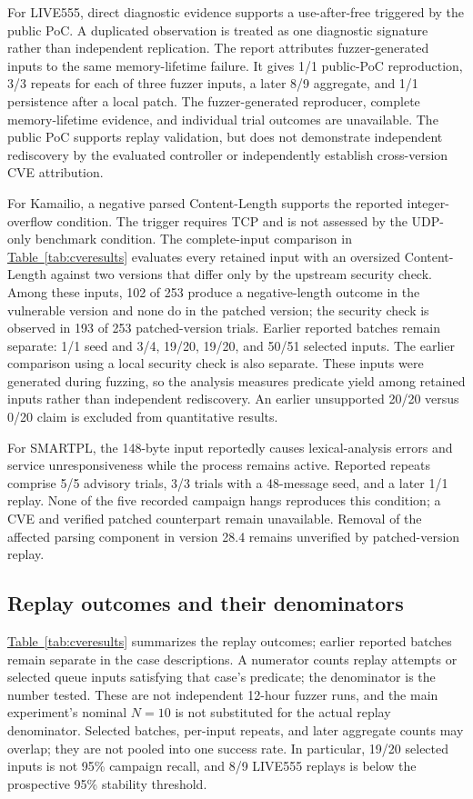 \documentclass[final,5p,times,number]{elsarticle}
\newcommand{\namedref}[2]{\hyperref[#2]{#1~\ref*{#2}}}
\begin{document}
For LIVE555, direct diagnostic evidence supports a use-after-free triggered by the public PoC. A duplicated observation is treated as one diagnostic signature rather than independent replication. The report attributes fuzzer-generated inputs to the same memory-lifetime failure. It gives 1/1 public-PoC reproduction, 3/3 repeats for each of three fuzzer inputs, a later 8/9 aggregate, and 1/1 persistence after a local patch. The fuzzer-generated reproducer, complete memory-lifetime evidence, and individual trial outcomes are unavailable. The public PoC supports replay validation, but does not demonstrate independent rediscovery by the evaluated controller or independently establish cross-version CVE attribution.

For Kamailio, a negative parsed Content-Length supports the reported integer-overflow condition. The trigger requires TCP and is not assessed by the UDP-only benchmark condition. The complete-input comparison in \namedref{Table}{tab:cveresults} evaluates every retained input with an oversized Content-Length against two versions that differ only by the upstream security check. Among these inputs, 102 of 253 produce a negative-length outcome in the vulnerable version and none do in the patched version; the security check is observed in 193 of 253 patched-version trials. Earlier reported batches remain separate: 1/1 seed and 3/4, 19/20, 19/20, and 50/51 selected inputs. The earlier comparison using a local security check is also separate. These inputs were generated during fuzzing, so the analysis measures predicate yield among retained inputs rather than independent rediscovery. An earlier unsupported 20/20 versus 0/20 claim is excluded from quantitative results.

For SMARTPL, the 148-byte input reportedly causes lexical-analysis errors and service unresponsiveness while the process remains active. Reported repeats comprise 5/5 advisory trials, 3/3 trials with a 48-message seed, and a later 1/1 replay. None of the five recorded campaign hangs reproduces this condition; a CVE and verified patched counterpart remain unavailable. Removal of the affected parsing component in version 28.4 remains unverified by patched-version replay.

\subsection{Replay outcomes and their denominators}
\namedref{Table}{tab:cveresults} summarizes the replay outcomes; earlier reported batches remain separate in the case descriptions. A numerator counts replay attempts or selected queue inputs satisfying that case's predicate; the denominator is the number tested. These are not independent 12-hour fuzzer runs, and the main experiment's nominal $N=10$ is not substituted for the actual replay denominator. Selected batches, per-input repeats, and later aggregate counts may overlap; they are not pooled into one success rate. In particular, 19/20 selected inputs is not 95\% campaign recall, and 8/9 LIVE555 replays is below the prospective 95\% stability threshold.
\end{document}
